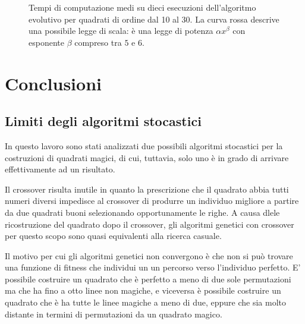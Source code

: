 \documentclass[italian,twoside,twocolumn]{article}
\begin{document}
\begin{figure}[htbp]
	\centering
	\caption{Tempi di computazione medi su dieci esecuzioni dell'algoritmo evolutivo per quadrati di ordine dal 10 al 30. La curva rossa descrive una possibile legge di scala: è una legge di potenza $ \alpha x^{\beta} $ con esponente $ \beta $ compreso tra $ 5 $ e $ 6 $. }
	\label{fig:scala_xie_kang}
\end{figure}

\section{Conclusioni}

\subsection{Limiti degli algoritmi stocastici}
In questo lavoro sono stati analizzati due possibili algoritmi stocastici per la costruzioni di quadrati magici, di cui, tuttavia, solo uno è in grado di arrivare effettivamente ad un risultato. 

Il crossover risulta inutile in quanto la prescrizione che il quadrato abbia tutti numeri diversi impedisce al crossover di produrre un individuo migliore a partire da due quadrati buoni selezionando opportunamente le righe. A causa dlele ricostruzione del quadrato dopo il crossover, gli algoritmi genetici con crossover per questo scopo sono quasi equivalenti alla ricerca casuale. 

Il motivo per cui gli algoritmi genetici non convergono è che non si può trovare una funzione di fitness che individui un un percorso verso l'individuo perfetto. E' possibile costruire un quadrato che è perfetto a meno di due sole permutazioni ma che ha fino a otto linee non magiche, e viceversa è possibile costruire un quadrato che è ha tutte le linee magiche a meno di due, eppure che sia molto distante in termini di permutazioni da un quadrato magico.
\end{document}
